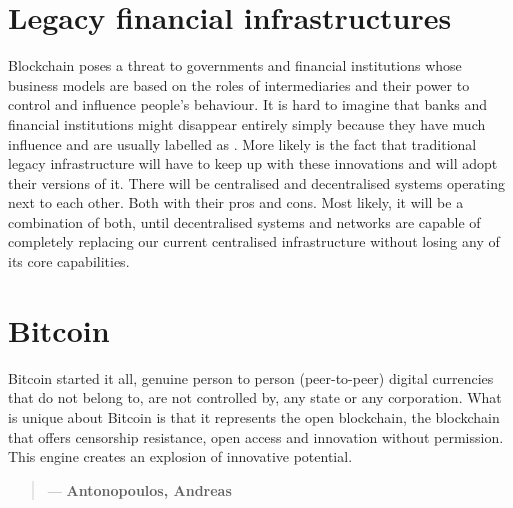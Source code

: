 \section{Legacy financial infrastructures}
Blockchain poses a threat to governments and financial institutions whose business models are based on the roles of intermediaries and their power to control and influence people's behaviour. It is hard to imagine that banks and financial institutions might disappear entirely simply because they have much influence and are usually labelled as . More likely is the fact that traditional legacy infrastructure will have to keep up with these innovations and will adopt their versions of it. There will be centralised and decentralised systems operating next to each other. Both with their pros and cons. Most likely, it will be a combination of both, until decentralised systems and networks are capable of completely replacing our current centralised infrastructure without losing any of its core capabilities.

\section{Bitcoin}
Bitcoin started it all, genuine person to person (peer-to-peer) digital currencies that do not belong to, are not controlled by, any state or any corporation.  What is unique about Bitcoin is that it represents the open blockchain, the blockchain that offers censorship resistance, open access and innovation without permission. This engine creates an explosion of innovative potential. 
\medskip


 \begin{quotation}

      \textit{}
      \begin{flushright}
        \small{--- \textbf{Antonopoulos, Andreas}}
      \end{flushright}
    
\end{quotation}


